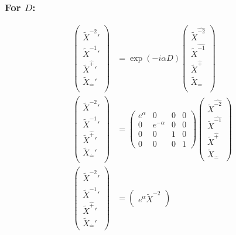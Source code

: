 \documentclass[]{article}
\numberwithin{equation}{section}
\begin{document}
{{\subsubsection{For $D$:}
\begin{align}
\begin{pmatrix}
    \tilde{X}^{\hat{-2}}'\\
    \tilde{X}^{\hat{-1}}'\\
    \tilde{X}^{\hat{+}}'\\
    \tilde{X}_{\hat{-}}'\\
    \end{pmatrix}&= \exp{(-i\alpha D)}\begin{pmatrix}
    \tilde{X}^{\hat{-2}}\\
    \tilde{X}^{\hat{-1}}\\
    \tilde{X}^{\hat{+}}\\
    \tilde{X}_{\hat{-}}\\
    \end{pmatrix}\\
    \begin{pmatrix}
    \tilde{X}^{\hat{-2}}'\\
    \tilde{X}^{\hat{-1}}'\\
    \tilde{X}^{\hat{+}}'\\
    \tilde{X}_{\hat{-}}'\\
    \end{pmatrix}&= \begin{pmatrix}
        e^{\alpha}&0&0&0\\
        0&e^{-\alpha}&0&0\\
        0&0&1&0\\
        0&0&0&1
    \end{pmatrix}\begin{pmatrix}
    \tilde{X}^{\hat{-2}}\\
    \tilde{X}^{\hat{-1}}\\
    \tilde{X}^{\hat{+}}\\
    \tilde{X}_{\hat{-}}
    \end{pmatrix}\\
    \begin{pmatrix}
    \tilde{X}^{\hat{-2}}'\\
    \tilde{X}^{\hat{-1}}'\\
    \tilde{X}^{\hat{+}}'\\
    \tilde{X}_{\hat{-}}'
    \end{pmatrix}&= \begin{pmatrix}
    e^{\alpha}\tilde{X}^{-2}\\

\end{pmatrix}
\end{align}}}
\end{document}
